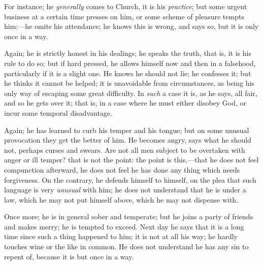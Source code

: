 For instance; he \emph{generally} comes to Church, it is his \emph{practice};
but some urgent business at a certain time presses on him, or some
scheme of pleasure tempts him:—he omits his attendance; he knows
this is wrong, and says so, but it is only once in a way.

Again; he is strictly honest in his dealings; he speaks the truth,
that is, it is his rule to do so; but if hard pressed, he allows
himself now and then in a falsehood, particularly if it is a slight
one. He knows he should not lie; he confesses it; but he thinks it
cannot be helped; it is unavoidable from circumstances, as being his
only way of escaping some great difficulty. In \emph{such} a case it
is, as he says, all fair, and so he gets over it; that is, in a case
where he must either disobey God, or incur some temporal disadvantage.

Again; he has learned to curb his temper and his tongue; but on
some unusual provocation they get the better of him. He becomes angry,
says what he should not, perhaps curses and swears. Are not all men
subject to be overtaken with anger or ill temper? that is not the
point: the point is this,—that he does not feel compunction
afterward, he does not feel he has done any thing which needs
forgiveness. On the contrary, he defends himself to himself, on the
plea that such language is very \emph{unusual} with him; he does not
understand that he is under a law, which he may not put himself above,
which he may not dispense with.

Once more; he is in general sober and temperate; but he joins a
party of friends and makes merry; he is tempted to exceed. Next day he
says that it is a long time since such a thing happened to him; it is
not at all his way; he hardly touches wine or the like in common. He
does not understand he has any sin to repent of, because it is but
once in a way.

